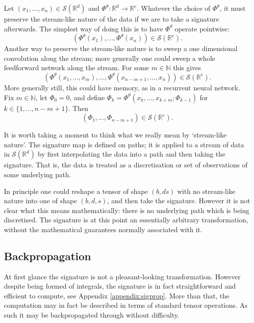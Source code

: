 \documentclass{article}
\theoremstyle{plain}
\theoremstyle{definition}
\begin{document}
	Let $(x_1, \ldots, x_n) \in \mathcal S(\mathbb R^d)$ and $\Phi^\theta \colon \mathbb R^d \to \mathbb R^e$. Whatever the choice of $\Phi^\theta$, it must preserve the stream-like nature of the data if we are to take a signature afterwards. The simplest way of doing this is to have $\Phi^\theta$ operate pointwise:
	\begin{equation*}
	(\Phi^\theta(x_1), \ldots, \Phi^\theta(x_n)) \in \mathcal S(\mathbb R^e).
	\end{equation*}
	Another way to preserve the stream-like nature is to sweep a one dimensional convolution along the stream; more generally one could sweep a whole feedforward network along the stream. For some $ m \in \mathbb N $ this gives
	\begin{equation*}
	(\Phi^\theta(x_1, \ldots, x_m), \ldots, \Phi^\theta(x_{n - m + 1}, \ldots, x_n)) \in \mathcal S(\mathbb R^e).
	\end{equation*}
	More generally still, this could have memory, as in a recurrent neural network. Fix $m \in \mathbb N$, let $\Phi_{0} = 0$, and define $\Phi_k = \Phi^\theta\left(x_k, \ldots, x_{k + m}; \Phi_{k - 1}\right)$ for $k \in \{1, \ldots, n - m + 1\}$. Then
	\begin{equation*}
	(\Phi_1, \ldots, \Phi_{n -m +1}) \in \mathcal S(\mathbb R^e).
	\end{equation*}
	
	It is worth taking a moment to think what we really mean by `stream-like nature'. The signature map is defined on paths; it is applied to a stream of data in $\mathcal S(\mathbb R^d)$ by first interpolating the data into a path and then taking the signature. That is, the data is treated as a discretisation or set of observations of some underlying path.
	
	In principle one could reshape a tensor of shape $(b, ds)$ with no stream-like nature into one of shape $(b, d, s)$, and then take the signature. However it is not clear what this means mathematically: there is no underlying path which is being discretised. The signature is at this point an essentially arbitrary transformation, without the mathematical guarantees normally associated with it.
	
	\subsection{Backpropagation}
	At first glance the signature is not a pleasant-looking transformation. However despite being formed of integrals, the signature is in fact straightforward and efficient to compute, see Appendix \ref{appendix:sigprop}. More than that, the computation may in fact be described in terms of standard tensor operations. As such it may be backpropagated through without difficulty. %
	
\end{document}
